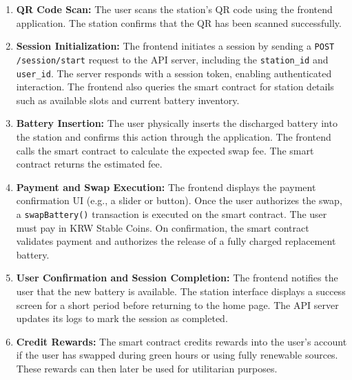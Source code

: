 \documentclass[12pt,a4paper]{article}
\begin{document}
\begin{enumerate}[label=\textbf{Step \arabic*:}, wide=0pt, leftmargin=*]
    \item \textbf{QR Code Scan:} The user scans the station's QR code using the frontend application. The station confirms that the QR has been scanned successfully.
    
    \item \textbf{Session Initialization:}  
    The frontend initiates a session by sending a \texttt{POST /session/start} request to the API server, including the \texttt{station\_id} and \texttt{user\_id}.  
    The server responds with a session token, enabling authenticated interaction.  
    The frontend also queries the smart contract for station details such as available slots and current battery inventory.

    \item \textbf{Battery Insertion:}  
    The user physically inserts the discharged battery into the station and confirms this action through the application.  
    The frontend calls the smart contract to calculate the expected swap fee. The smart contract returns the estimated fee.

    \item \textbf{Payment and Swap Execution:}  
    The frontend displays the payment confirmation UI (e.g., a slider or button).  
    Once the user authorizes the swap, a \texttt{swapBattery()} transaction is executed on the smart contract. The user must pay in KRW Stable Coins.
    On confirmation, the smart contract validates payment and authorizes the release of a fully charged replacement battery.

    \item \textbf{User Confirmation and Session Completion:}  
    The frontend notifies the user that the new battery is available.  
    The station interface displays a success screen for a short period before returning to the home page.  
    The API server updates its logs to mark the session as completed.
    
    \item \textbf{Credit Rewards:}  
    The smart contract credits rewards into the user's account if the user has swapped during green hours or using fully renewable sources. These rewards can then later be used for utilitarian purposes. 
\end{enumerate}
\end{document}

